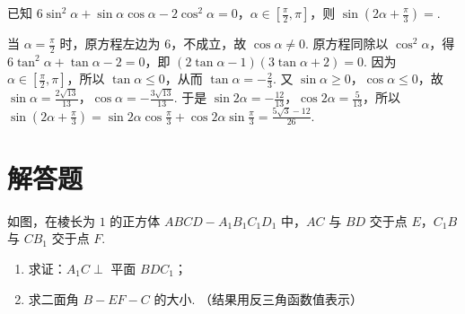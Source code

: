 \begin{problem}
已知 \(6\sin^2\alpha+\sin\alpha\cos\alpha-2\cos^2\alpha=0\)，\(\alpha\in\left[\frac{\pi}{2},\pi\right]\)，则 \(\sin\left(2\alpha+\frac{\pi}{3}\right)=\)\fillinblank{}.
\end{problem}

\begin{solution}
当 \(\alpha=\frac{\pi}{2}\) 时，原方程左边为 \(6\)，不成立，故 \(\cos\alpha\neq0\). 原方程同除以 \(\cos^2\alpha\)，得 \(6\tan^2\alpha+\tan\alpha-2=0\)，即 \((2\tan\alpha-1)(3\tan\alpha+2)=0\). 因为 \(\alpha\in\left[\frac{\pi}{2},\pi\right]\)，所以 \(\tan\alpha\leqslant0\)，从而 \(\tan\alpha=-\frac{2}{3}\). 又 \(\sin\alpha\geqslant0\)，\(\cos\alpha\leqslant0\)，故 \(\sin\alpha=\frac{2\sqrt{13}}{13}\)，\(\cos\alpha=-\frac{3\sqrt{13}}{13}\). 于是 \(\sin2\alpha=-\frac{12}{13}\)，\(\cos2\alpha=\frac{5}{13}\)，所以 \(\sin\left(2\alpha+\frac{\pi}{3}\right)=\sin2\alpha\cos\frac{\pi}{3}+\cos2\alpha\sin\frac{\pi}{3}=\frac{5\sqrt{3}-12}{26}\).
\end{solution}

\section{解答题}
\begin{problem}
如图，在棱长为 \(1\) 的正方体 \(ABCD-A_1B_1C_1D_1\) 中，\(AC\) 与 \(BD\) 交于点 \(E\)，\(C_1B\) 与 \(CB_1\) 交于点 \(F\).

\begin{enumerate}
\item 求证：\(A_1C\perp\) 平面 \(BDC_1\)；

\item 求二面角 \(B-EF-C\) 的大小. （结果用反三角函数值表示）
\end{enumerate}

\end{problem}

